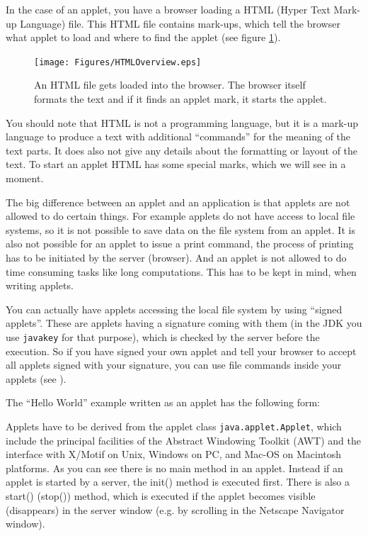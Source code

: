 In the case of an applet, you have a browser loading a HTML 
(Hyper Text Mark-up Language) file. This HTML file contains
mark-ups, which tell the browser what applet to load and
where to find the applet (see figure \ref{fig:HTMLOverview}). 
\begin{figure}[htbp]
  \begin{center}
    \texttt{[image: Figures/HTMLOverview.eps]}
    \caption{An HTML file gets loaded into the browser. The browser itself formats the text and if it finds an applet mark, it starts the applet.}
    \label{fig:HTMLOverview}
  \end{center}
\end{figure}
You should note that HTML is not a programming language, but
it is a mark-up language to produce a text with additional
``commands'' for the meaning of the text parts. It does also
not give any details about the formatting or layout of the
text. To start an applet HTML has some special marks, which we
will see in a moment.  

The big difference between an applet and an application is that
applets are not allowed to do certain things. For example applets
do not have access to local file systems, so it is not possible
to save data on the file system from an applet. It is also not
possible for an applet to issue a print command, the process of
printing has to be initiated by the server (browser). 
And an applet is not allowed to do time consuming tasks like
long computations. This has to be kept in mind, when writing
applets.

You can actually have applets accessing the local file system by using
``signed applets''. These are applets having a signature coming
with them (in the JDK you use \verb|javakey| for that purpose), 
which is checked by the server before the execution. So
if you have signed your own applet and tell your browser to accept 
all applets signed with your signature, you can use file commands
inside your applets (see \cite[page 142]{javanutshell}).

The ``Hello World'' example written as an applet has the following form:

Applets have to be derived from the applet class
\verb|java.applet.Applet|, which include the principal facilities of
the Abstract Windowing Toolkit (AWT) and the interface with X/Motif on
Unix, Windows on PC, and Mac-OS on Macintosh platforms.
As you can see there is no main method in an applet. Instead if an applet
is started by a server, the init() method is executed first. There is also
a start() (stop()) method, which is executed if the applet becomes
visible (disappears) in the server window (e.g. by scrolling in the
Netscape Navigator window).

